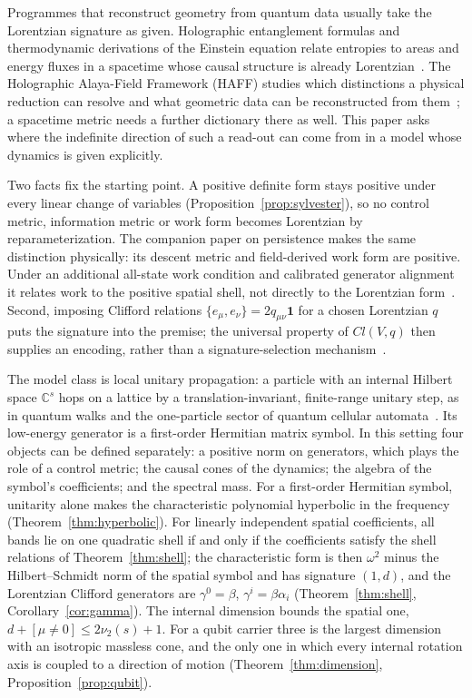 \documentclass[12pt]{article}
\theoremstyle{definition}
\theoremstyle{remark}
\begin{document}
Programmes that reconstruct geometry from quantum data usually take the Lorentzian signature as given. Holographic entanglement formulas and thermodynamic derivations of the Einstein equation relate entropies to areas and energy fluxes in a spacetime whose causal structure is already Lorentzian~\cite{RyuTakayanagi2006,Jacobson1995}. The Holographic Alaya-Field Framework (HAFF) studies which distinctions a physical reduction can resolve and what geometric data can be reconstructed from them~\cite{Liu2026PaperA,Liu2026PaperB}; a spacetime metric needs a further dictionary there as well. This paper asks where the indefinite direction of such a read-out can come from in a model whose dynamics is given explicitly.

Two facts fix the starting point. A positive definite form stays positive under every linear change of variables (Proposition~\ref{prop:sylvester}), so no control metric, information metric or work form becomes Lorentzian by reparameterization. The companion paper on persistence makes the same distinction physically: its descent metric and field-derived work form are positive. Under an additional all-state work condition and calibrated generator alignment it relates work to the positive spatial shell, not directly to the Lorentzian form~\cite{Liu2026QRAIF_B}. Second, imposing Clifford relations $\{e_\mu,e_\nu\}=2q_{\mu\nu}\mathbf 1$ for a chosen Lorentzian $q$ puts the signature into the premise; the universal property of $Cl(V,q)$ then supplies an encoding, rather than a signature-selection mechanism~\cite{Hestenes1966,Doran2003}.

The model class is local unitary propagation: a particle with an internal Hilbert space $\mathbb C^s$ hops on a lattice by a translation-invariant, finite-range unitary step, as in quantum walks and the one-particle sector of quantum cellular automata~\cite{BialynickiBirula1994,Meyer1996,Strauch2006,BisioDArianoTosini2015,DArianoPerinotti2014}. Its low-energy generator is a first-order Hermitian matrix symbol. In this setting four objects can be defined separately: a positive norm on generators, which plays the role of a control metric; the causal cones of the dynamics; the algebra of the symbol's coefficients; and the spectral mass. For a first-order Hermitian symbol, unitarity alone makes the characteristic polynomial hyperbolic in the frequency (Theorem~\ref{thm:hyperbolic}). For linearly independent spatial coefficients, all bands lie on one quadratic shell if and only if the coefficients satisfy the shell relations of Theorem~\ref{thm:shell}; the characteristic form is then $\omega^2$ minus the Hilbert--Schmidt norm of the spatial symbol and has signature $(1,d)$, and the Lorentzian Clifford generators are $\gamma^0=\beta$, $\gamma^i=\beta\alpha_i$ (Theorem~\ref{thm:shell}, Corollary~\ref{cor:gamma}). The internal dimension bounds the spatial one, $d+[\mu\neq0]\le2\nu_2(s)+1$. For a qubit carrier three is the largest dimension with an isotropic massless cone, and the only one in which every internal rotation axis is coupled to a direction of motion (Theorem~\ref{thm:dimension}, Proposition~\ref{prop:qubit}).
\end{document}
